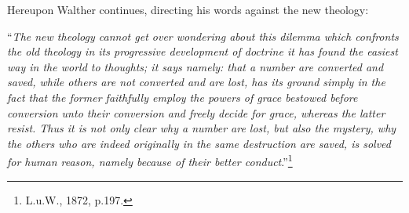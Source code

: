                 Hereupon Walther continues, directing his words against the new theology: \begin{displayquote}“\textit{The new theology cannot get over wondering about this dilemma which confronts the old theology in its progressive development of doctrine it has found the easiest way in the world to thoughts; it says namely: that a number are converted and saved, while others are not converted and are lost, has its ground simply in the fact that the former faithfully employ the powers of grace bestowed before conversion unto their conversion and freely decide for grace, whereas the latter resist.  Thus it is not only clear why a number are lost, but also the mystery, why the others who are indeed originally in the same destruction are saved, is solved for human reason, namely because of their better conduct}.''\footnote{L.u.W., 1872, p.197.}\end{displayquote}

